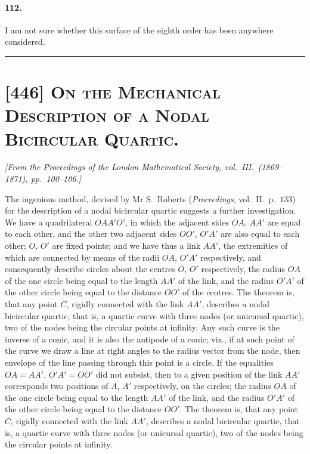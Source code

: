 \documentclass[11pt,a4paper]{article}
\begin{document}
\medskip

\paragraph{112.}
I am not sure whether this surface of the eighth order has been anywhere considered.

\bigskip
\hrule
\bigskip

\section*{[446] \textsc{On the Mechanical Description of a Nodal Bicircular Quartic.}}

\begin{center}
\textit{[From the Proceedings of the London Mathematical Society, vol.\ III.\ (1869--1871), pp.\ 100--106.]}
\end{center}

\medskip

\noindent The ingenious method, devised by Mr S.\ Roberts (\textit{Proceedings},
vol.\ II.\ p.\ $133$) for the description of a nodal bicircular quartic suggests a
further investigation. We have a quadrilateral $OAA'O'$, in which the adjacent sides
$OA$, $A A'$ are equal to each other, and the other two adjacent sides $OO'$,
$O'A'$ are also equal to each other; $O$, $O'$ are fixed points; and we have thus
a link $A A'$, the extremities of which are connected by means of the radii $OA$,
$O'A'$ respectively, and consequently describe circles about the centres $O$, $O'$
respectively, the radius $OA$ of the one circle being equal to the length $A A'$ of
the link, and the radius $O'A'$ of the other circle being equal to the distance
$OO'$ of the centres. The theorem is, that any point $C$, rigidly connected with the
link $A A'$, describes a nodal bicircular quartic, that is, a quartic curve with
three nodes (or unicursal quartic), two of the nodes being the circular points at
infinity. Any such curve is the inverse of a conic, and it is also the antipode of
a conic; viz., if at such point of the curve we draw a line at right angles to the
radius vector from the node, then envelope of the line passing through this point is
a circle. If the equalities $OA = AA'$, $O'A' = OO'$ did not subsist, then to a given
position of the link $AA'$ corresponds two positions of $A$, $A'$ respectively, on
the circles; the radius $OA$ of the one circle being equal to the length $AA'$ of
the link, and the radius $O'A'$ of the other circle being equal to the distance
$OO'$. The theorem is, that any point $C$, rigidly connected with the link $AA'$,
describes a nodal bicircular quartic, that is, a quartic curve with three nodes (or
unicursal quartic), two of the nodes being the circular points at infinity.
\end{document}
